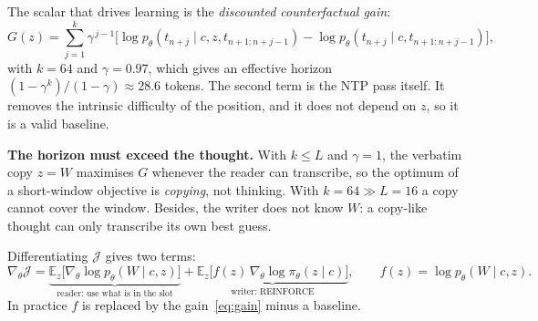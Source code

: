 \documentclass[11pt]{article}
\begin{document}
The scalar that drives learning is the \emph{discounted counterfactual gain}:
\begin{equation}
G(z)=\sum_{j=1}^{k}\gamma^{\,j-1}\Big[\log p_\theta(t_{n+j}\mid c,z,t_{n+1:n+j-1})-\log p_\theta(t_{n+j}\mid c,t_{n+1:n+j-1})\Big],
\label{eq:gain}
\end{equation}
with $k=64$ and $\gamma=0.97$, which gives an effective horizon $(1-\gamma^k)/(1-\gamma)\approx 28.6$ tokens. The second term is the NTP pass itself. It removes the intrinsic difficulty of the position, and it does not depend on $z$, so it is a valid baseline.

\textbf{The horizon must exceed the thought.} With $k\le L$ and $\gamma=1$, the verbatim copy $z=W$ maximises $G$ whenever the reader can transcribe, so the optimum of a short-window objective is \emph{copying}, not thinking. With $k=64\gg L=16$ a copy cannot cover the window. Besides, the writer does not know $W$: a copy-like thought can only transcribe its own best guess.

Differentiating $\mathcal{J}$ gives two terms:
\begin{equation}
\nabla_\theta\mathcal{J}=\underbrace{\mathbb{E}_z\big[\nabla_\theta\log p_\theta(W\mid c,z)\big]}_{\text{reader: use what is in the slot}}+\underbrace{\mathbb{E}_z\big[f(z)\,\nabla_\theta\log\pi_\theta(z\mid c)\big]}_{\text{writer: REINFORCE}},\qquad f(z)=\log p_\theta(W\mid c,z).
\end{equation}
In practice $f$ is replaced by the gain~\eqref{eq:gain} minus a baseline.
\end{document}

